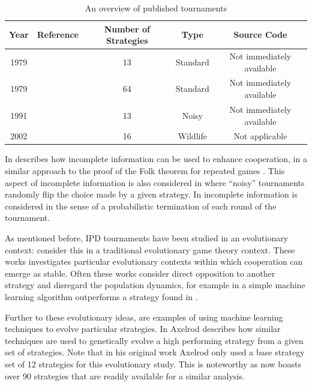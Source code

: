 \documentclass{article}
\begin{document}
\begin{table}[!hbtp]
    \begin{center}
        \begin{tabular}{ccccc}
            \toprule
            Year     & Reference           & Number of Strategies & Type     & Source Code\\
            \midrule
            1979     & \cite{Axelrod1980a} & 13                   & Standard & Not immediately available\\
            1979     & \cite{Axelrod1980b} & 64                   & Standard & Not immediately available\\
            1991     & \cite{Bendor1991}   & 13                   & Noisy    & Not immediately available\\
            2002     & \cite{Stephens2002} & 16                   & Wildlife & Not applicable\\
            \bottomrule
        \end{tabular}
    \end{center}
    \caption{An overview of published tournaments}\label{tab:tournaments}
\end{table}

In \cite{Milgrom1982} describes how incomplete information can be used to
enhance cooperation, in a similar approach to the proof of the Folk theorem for
repeated games \cite{Maschler2013}. This aspect of incomplete information is
also considered in \cite{Molander1985, Bendor1991, Lee2015} where ``noisy''
tournaments randomly flip the choice made by a given strategy. In
\cite{Murnighan2015} incomplete information is considered in the sense of a
probabilistic termination of each round of the tournament.

As mentioned before, IPD tournaments have been studied in an evolutionary
context: \cite{Ellison1994, Lee2015, Press2012, Stewart2012} consider this in a
traditional evolutionary game theory context. These works investigates
particular evolutionary contexts within which cooperation can emerge as stable.
Often these works consider direct opposition to another strategy and disregard
the population dynamics, for example in \cite{Lee2015} a simple machine learning
algorithm outperforms a strategy found in \cite{Press2012}.

Further to these evolutionary ideas, \cite{Chellapilla1999, DavidB1993} are
examples of using machine learning techniques to evolve particular strategies.
In \cite{Axelrod} Axelrod describes how similar techniques are used to
genetically evolve a high performing strategy from a given set of strategies.
Note that in his original work Axelrod only used a base strategy set of 12
strategies for this evolutionary study. This is noteworthy as
\cite{Axelrod-Pythonprojectteam2015} now boasts over 90 strategies that are
readily available for a similar analysis.
\end{document}
